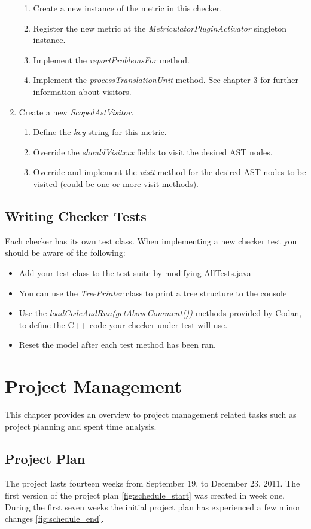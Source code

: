 \documentclass[11pt,a4paper,oneside]{scrreprt}
\begin{document}
\begin{enumerate}
\begin{enumerate}
\item Create a new instance of the metric in this checker.
\item Register the new metric at the \textit{MetriculatorPluginActivator} singleton instance.
\item Implement the \textit{reportProblemsFor} method.
\item Implement the \textit{processTranslationUnit} method. See chapter 3 for further information about visitors.
\end{enumerate}
\item Create a new \textit{ScopedAstVisitor}.
\begin{enumerate}
\item Define the \textit{key} string for this metric.
\item Override the \textit{shouldVisitxxx} fields to visit the desired AST nodes.
\item Override and implement the \textit{visit} method for the desired AST nodes to be visited (could be one or more visit methods).
\end{enumerate}
\end{enumerate}

\section{Writing Checker Tests}
Each checker has its own test class. When implementing a new checker test you should be aware of the following:

\begin{itemize}
\item Add your test class to the test suite by modifying AllTests.java
\item You can use the \textit{TreePrinter} class to print a tree structure to the console
\item Use the \textit{loadCodeAndRun(getAboveComment())} methods provided by Codan, to define the C++ code your checker under test will use.
\item Reset the model after each test method has been ran.
\end{itemize}

\chapter{Project Management}
This chapter provides an overview to project management related tasks such as project planning and spent time analysis.
\section{Project Plan}
The project lasts fourteen weeks from September 19. to December 23. 2011. The first version of the project plan \ref{fig:schedule_start} was created in week one. During the first seven weeks the initial project plan has experienced a few minor changes \ref{fig:schedule_end}.
\end{document}
